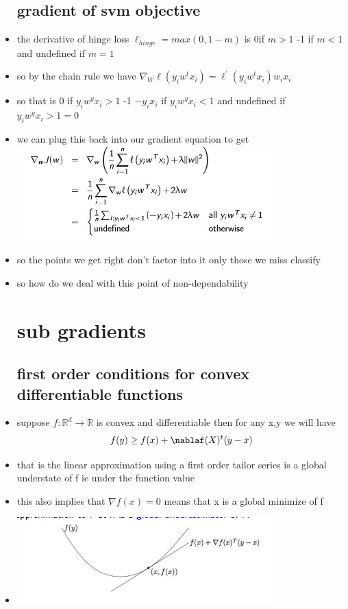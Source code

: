 \documentclass{article}
\begin{document}
\begin{itemize}
\subsection{gradient of svm objective}
\item the derivative of hinge loss $\ell_{hinge}=max(0,1-m)$ is 0if $m>1 $ -1 if $m<1$ and undefined if $m=1$
\item so by the chain rule we have $\nabla_{W}\ell(y_iw^{t}x_i)=\ell^{'}(y_iw^{t}x_i)w_ix_i$ 
\item so that is 0 if $y_{i}w^{y}x_i>1$ -1 $-y_{i}x_{i}$ if $y_{i}w^{y}x_i<1$ and undefined if $y_{i}w^{y}x_i>1=0$
\item we can plug this back into our gradient equation to get \\\includegraphics[width=10cm]{lecture_notes/lecture_4/immmages/l4_7.jpg}
\item so the points we get right don't factor into it only those we miss classify
\item so how do we deal with this point of non-dependability
\section{sub gradients}
\subsection{first order conditions for convex differentiable functions}
\item suppose $f: \mathbb{R}^{d}\rightarrow \mathbb{R}$ is convex and differentiable then for any x,y we will have $$f(y)\geq f(x)+\nablaf(X)^{t}(y-x)$$
\item that is the linear approximation using a first order tailor series is a global understate of f ie under the function value 
\item this also implies that $\nabla f(x)=0$ means that x is a global minimize of f
\item \includegraphics[width=10cm]{lecture_notes/lecture_4/immmages/l4_8.jpg}

\end{itemize}
\end{document}
